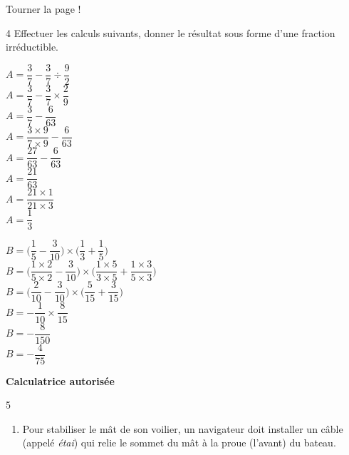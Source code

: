 \documentclass[a4paper]{book}
\begin{document}
{\vfill
\hfill Tourner la page !


\newpage


    \begin{exerciceNote}{4}
        Effectuer les calculs suivants, donner le résultat sous forme d'une fraction irréductible.

        \begin{minipage}{0.45\linewidth}
            $A = \dfrac{3}{7}-\dfrac{3}{7}\div\dfrac{9}{2}$\\[2ex]
            $A = \dfrac{3}{7}-\dfrac{3}{7}\times\dfrac{2}{9}$\\[2ex]
            $A = \dfrac{3}{7}-\dfrac{6}{63}$\\[2ex]
            $A = \dfrac{3\times9}{7\times9}-\dfrac{6}{63}$\\[2ex]
            $A = \dfrac{27}{63}-\dfrac{6}{63}$\\[2ex]
            $A = \dfrac{21}{63}$\\[2ex]
            $A = \dfrac{21\times1}{21\times3}$\\[2ex]
            $A = \dfrac{1}{3}$
        \end{minipage}
        \hfill\vline\hfill
        \begin{minipage}{0.45\linewidth}
            $B = \bigg(\dfrac{1}{5}-\dfrac{3}{10}\bigg)\times\bigg(\dfrac{1}{3}+\dfrac{1}{5}\bigg)$\\[2ex]
            $B = \bigg(\dfrac{1\times2}{5\times2}-\dfrac{3}{10}\bigg)\times\bigg(\dfrac{1\times5}{3\times5}+\dfrac{1\times3}{5\times3}\bigg)$\\[2ex]
            $B = \bigg(\dfrac{2}{10}-\dfrac{3}{10}\bigg)\times\bigg(\dfrac{5}{15}+\dfrac{3}{15}\bigg)$\\ [2ex]
            $B = -\dfrac{1}{10}\times\dfrac{8}{15}$\\[2ex]
            $B = -\dfrac{8}{150}$\\[2ex]
            $B = -\dfrac{4}{75}$
        \end{minipage}   
    \end{exerciceNote}


\newpage


\textbf{Calculatrice autorisée}

    \begin{exerciceNote}{5}
        \begin{enumerate}[leftmargin=*]
            \item Pour stabiliser le mât de son voilier, un navigateur doit installer un câble (appelé \textit{étai}) qui relie le sommet du mât à la proue (l'avant) du bateau.
            

\end{enumerate}
\end{exerciceNote}}
\end{document}
